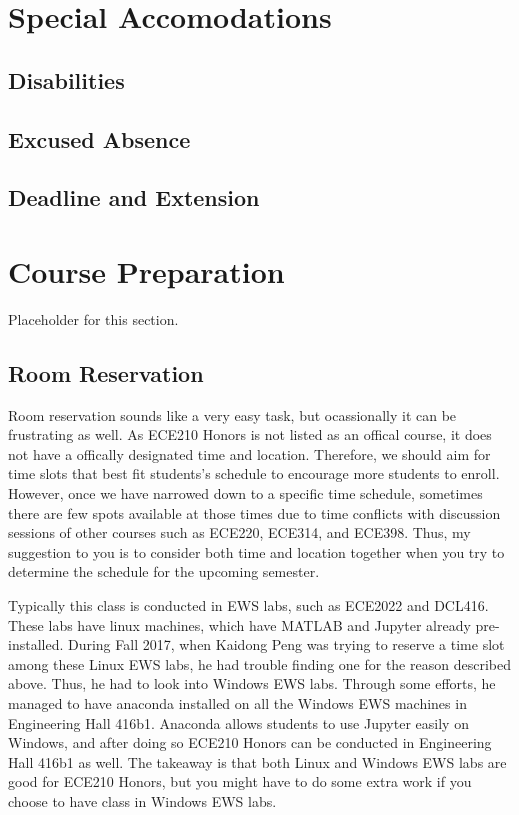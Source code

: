 \documentclass[12pt]{article}
\begin{document}
\section{Special Accomodations}
    \subsection{Disabilities}
    \subsection{Excused Absence}
    \subsection{Deadline and Extension}
\newpage

\section{Course Preparation}
    Placeholder for this section.
    \subsection{Room Reservation}
        Room reservation sounds like a very easy task, but ocassionally it can be frustrating as well. As ECE210 Honors is not listed as an offical course, it does not have a offically designated time and location. Therefore, we should aim for time slots that best fit students\rq s schedule to encourage more students to enroll. However, once we have narrowed down to a specific time schedule, sometimes there are few spots available at those times due to time conflicts with discussion sessions of other courses such as ECE220, ECE314, and ECE398. Thus, my suggestion to you is to consider both time and location together when you try to determine the schedule for the upcoming semester.

        Typically this class is conducted in EWS labs, such as ECE2022 and DCL416. These labs have linux machines, which have MATLAB and Jupyter already pre-installed. During Fall 2017, when Kaidong Peng was trying to reserve a time slot among these Linux EWS labs, he had trouble finding one for the reason described above. Thus, he had to look into Windows EWS labs. Through some efforts, he managed to have anaconda installed on all the Windows EWS machines in Engineering Hall 416b1. Anaconda allows students to use Jupyter easily on Windows, and after doing so ECE210 Honors can be conducted in Engineering Hall 416b1 as well. The takeaway is that both Linux and Windows EWS labs are good for ECE210 Honors, but you might have to do some extra work if you choose to have class in Windows EWS labs.
\end{document}
